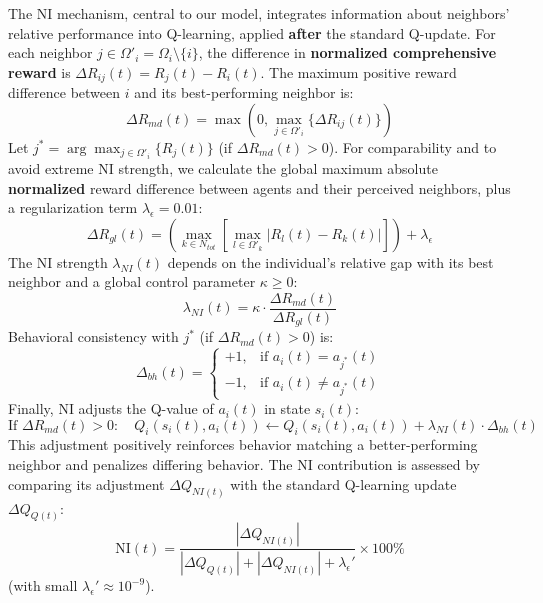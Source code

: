 \documentclass[preprint,number,sort&compress,12pt]{elsarticle}
\begin{document}
The NI mechanism, central to our model, integrates information about neighbors' relative performance into Q-learning, applied \textbf{after} the standard Q-update. For each neighbor $j \in \Omega'_i = \Omega_i \setminus \{i\}$, the difference in \textbf{normalized comprehensive reward} is $\Delta R_{ij}(t) = R_j(t) - R_i(t)$. The maximum positive reward difference between $i$ and its best-performing neighbor is:
\begin{equation}
\Delta R_{md}(t) = \max \left( 0, \max_{j \in \Omega'_i} \{ \Delta R_{ij}(t) \} \right)
\label{eq:max_diff_model_restored}
\end{equation}
Let $j^* = \arg \max_{j \in \Omega'_i} \{ R_j(t) \}$ (if $\Delta R_{md}(t) > 0$). For comparability and to avoid extreme NI strength, we calculate the global maximum absolute \textbf{normalized} reward difference between agents and their perceived neighbors, plus a regularization term $\lambda_{\epsilon}=0.01$:
\begin{equation}
\Delta R_{gl}(t) = \left( \max_{k \in N_{tot}} \left[ \max_{l \in \Omega'_k} |R_l(t) - R_k(t)| \right] \right) + \lambda_{\epsilon}
\label{eq:global_diff_model_restored}
\end{equation}
The NI strength $\lambda_{NI}(t)$ depends on the individual's relative gap with its best neighbor and a global control parameter $\kappa \ge 0$:
\begin{equation}
\lambda_{NI}(t) = \kappa \cdot \frac{\Delta R_{md}(t)}{\Delta R_{gl}(t)}
\label{eq:nei_weight_model_restored}
\end{equation}
Behavioral consistency with $j^*$ (if $\Delta R_{md}(t) > 0$) is:
\begin{equation}
\Delta_{bh}(t) =
\begin{cases}
+1, & \text{if } a_i(t) = a_{j^*}(t) \\
-1, & \text{if } a_i(t) \neq a_{j^*}(t)
\end{cases}
\label{eq:behavior_model_restored}
\end{equation}
Finally, NI adjusts the Q-value of $a_i(t)$ in state $s_i(t)$:
\begin{equation}
\text{If } \Delta R_{md}(t) > 0: \quad Q_i(s_i(t), a_i(t)) \leftarrow Q_i(s_i(t), a_i(t)) + \lambda_{NI}(t) \cdot \Delta_{bh}(t)
\label{eq:neighbor_update_model_restored}
\end{equation}
This adjustment positively reinforces behavior matching a better-performing neighbor and penalizes differing behavior. The NI contribution is assessed by comparing its adjustment $\Delta Q_{NI(t)}$ with the standard Q-learning update $\Delta Q_{Q(t)}$:
\begin{equation}
\text{NI}(t) = \frac{|\Delta Q_{NI(t)}|}{|\Delta Q_{Q(t)}| + |\Delta Q_{NI(t)}| + \lambda_{\epsilon}'} \times 100\%
\label{eq:neighbor_influence_percentage_restored}
\end{equation}
(with small $\lambda_{\epsilon}' \approx 10^{-9}$).
\end{document}
